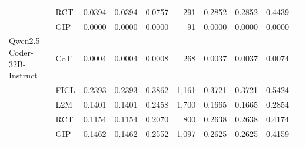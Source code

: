 \documentclass[conference]{IEEEtran}
\begin{document}
\begin{longtable}{p{3.5cm} l r r r r r r r r}
                    & RCT  & 0.0394 & 0.0394 & 0.0757 & 291 & 0.2852 & 0.2852 & 0.4439 \\
                    & GIP  & 0.0000 & 0.0000 & 0.0000 & 91 & 0.0000 & 0.0000 & 0.0000 \\ \addlinespace
Qwen2.5-Coder-32B-Instruct & CoT  & 0.0004 & 0.0004 & 0.0008 & 268 & 0.0037 & 0.0037 & 0.0074 \\
                           & FICL & 0.2393 & 0.2393 & 0.3862 & 1,161 & 0.3721 & 0.3721 & 0.5424 \\
                           & L2M  & 0.1401 & 0.1401 & 0.2458 & 1,700 & 0.1665 & 0.1665 & 0.2854 \\
                           & RCT  & 0.1154 & 0.1154 & 0.2070 & 800 & 0.2638 & 0.2638 & 0.4174 \\
                           & GIP  & 0.1462 & 0.1462 & 0.2552 & 1,097 & 0.2625 & 0.2625 & 0.4159 \\

  \bottomrule

\end{longtable}
\end{document}
